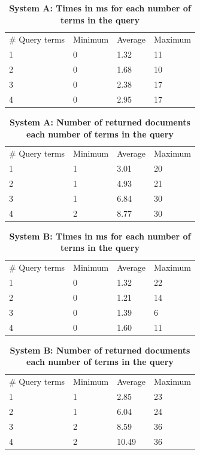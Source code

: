 \documentclass[letterpaper,10pt]{article}
\begin{document}
\begin{table}[h]
\centering
\caption { {\bf System A: Times in ms for each number of terms in the query } }
\begin{tabular}{llll}
\# Query terms & Minimum & Average & Maximum \\
1              & 0       & 1.32    & 11      \\
2              & 0       & 1.68    & 10      \\
3              & 0       & 2.38    & 17      \\
4              & 0       & 2.95    & 17       
\end{tabular}
\end{table}


\begin{table}[h]
\centering
\caption { {\bf System A: Number of returned documents each number of terms in the query } }
\begin{tabular}{llll}
\# Query terms & Minimum & Average & Maximum \\
1              & 1       & 3.01    & 20      \\
2              & 1       & 4.93    & 21      \\
3              & 1       & 6.84    & 30      \\
4              & 2       & 8.77    & 30       
\end{tabular}
\end{table}


\begin{table}[h]
\centering
\caption { {\bf System B: Times in ms for each number of terms in the query } }
\begin{tabular}{llll}
\# Query terms & Minimum & Average & Maximum \\
1              & 0       & 1.32    & 22      \\
2              & 0       & 1.21    & 14      \\
3              & 0       & 1.39    & 6      \\
4              & 0       & 1.60    & 11       
\end{tabular}
\end{table}

\begin{table}[h]
\centering
\caption { {\bf System B: Number of returned documents each number of terms in the query } }
\begin{tabular}{llll}
\# Query terms & Minimum & Average & Maximum \\
1              & 1       & 2.85    & 23      \\
2              & 1       & 6.04    & 24      \\
3              & 2       & 8.59    & 36      \\
4              & 2       & 10.49   & 36       
\end{tabular}
\end{table}
\end{document}
